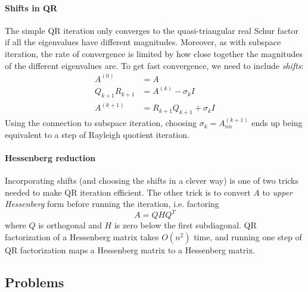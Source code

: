 \documentclass[12pt, leqno]{article}
\begin{document}
\paragraph{Shifts in QR}
The simple QR iteration only converges to the quasi-triangular
real Schur factor if all the eigenvalues have different magnitudes.
Moreover, as with subspace iteration, the rate of convergence is
limited by how close together the magnitudes of the different
eigenvalues are.  To get fast convergence, we need to include
{\em shifts}:
\begin{align*}
  A^{(0)} &= A \\
  Q_{k+1} R_{k+1} &= A^{(k)} - \sigma_k I\\
  A^{(k+1)} &= R_{k+1} Q_{k+1} + \sigma_k I
\end{align*}
Using the connection to subspace iteration, choosing
$\sigma_k = A^{(k+1)}_{nn}$ ends up being equivalent to a step of Rayleigh
quotient iteration.

\paragraph{Hessenberg reduction}
Incorporating shifts (and choosing the shifts in a clever way) is one
of two tricks needed to make QR iteration efficient.  The other trick
is to convert $A$ to {\em upper Hessenberg} form before running the
iteration, i.e. factoring
\[
  A = Q H Q^T
\]
where $Q$ is orthogonal and $H$ is zero below the first subdiagonal.
QR factorization of a Hessenberg matrix takes $O(n^2)$ time, and
running one step of QR factorization maps a Hessenberg matrix to a
Hessenberg matrix.

\subsection{Problems}
\end{document}

